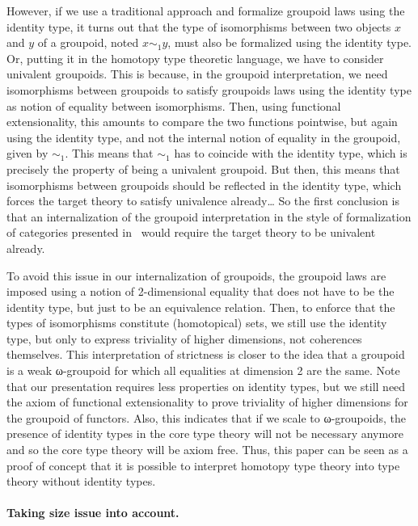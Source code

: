 However, if we use a traditional approach and formalize groupoid laws
using the identity type, it turns out that the type of isomorphisms
between two objects $x$ and $y$ of a groupoid, noted $x \sim_1 y$, must
also be formalized using the identity type. Or, putting it in the
homotopy type theoretic language, we have to consider univalent
groupoids.
%
This is because, in the groupoid interpretation, we need isomorphisms
between groupoids to satisfy groupoids laws using the identity
type as notion of equality between isomorphisms. Then, using
functional extensionality, this amounts to compare the two functions
pointwise, but again using the identity type, and not the internal
notion of equality in the groupoid, given by $\sim_1$.
%
This means that $\sim_1$ has to coincide with the identity type, which
is precisely the property  of being a univalent groupoid.
%
But then, this means that isomorphisms between groupoids should be
reflected in the identity type, which forces the target theory to
satisfy univalence already\ldots
%
So the first conclusion is that an internalization of the groupoid
interpretation in the style of formalization of categories presented
in~\cite{hottbook} would require the target theory to be univalent already.
 
To avoid this issue in our internalization of groupoids, the groupoid
laws are imposed using a notion of 2-dimensional equality that does
not have to be the identity type, but just to be an equivalence relation.
%
Then, to enforce that the types of isomorphisms constitute
(homotopical) sets, we still use the identity type, but only to
express triviality of higher dimensions, not coherences themselves.
%
This interpretation of strictness is closer to the idea that a
groupoid is a weak ω-groupoid for which all equalities at dimension 2
are the same.
%
%
Note that our presentation requires less properties on identity types,
but we still need the axiom of functional extensionality to prove
triviality of higher dimensions for the groupoid of functors.
%
Also, this indicates that if we scale to ω-groupoids, the presence of
identity types in the core type theory will
not be necessary anymore and so the core type theory will be axiom free.
%
Thus, this paper can be seen as a proof of concept that it is possible
to interpret homotopy type theory into type theory without identity
types.


\paragraph{\bf Taking size issue into account.}
%

